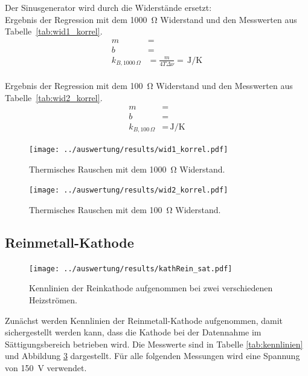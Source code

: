 Der Sinusgenerator wird durch die Widerstände ersetzt:\\
Ergebnis der Regression mit dem \SI{1000}{\ohm} Widerstand und den Messwerten aus \mbox{Tabelle \ref{tab:wid1_korrel}}.
\begin{align*}
m &= \\
b &= \\
k_{B,1000\,\Omega} &= \frac{m}{4T\Delta\nu} =\,\si{\joule\per\kelvin}\\
\end{align*}

Ergebnis der Regression mit dem \SI{100}{\ohm} Widerstand und den Messwerten aus \mbox{Tabelle \ref{tab:wid2_korrel}}.
\begin{align*}
m &= \\
b &= \\
k_{B,100\,\Omega} &= \,\si{\joule\per\kelvin}
\end{align*}

\begin{figure}[htbp]
	\texttt{[image: ../auswertung/results/wid1\_korrel.pdf]}
	\caption{Thermisches Rauschen mit dem \SI{1000}{\ohm} Widerstand.}
	\label{fig:thermRauschen1}
\end{figure}

\begin{figure}[htbp]
	\texttt{[image: ../auswertung/results/wid2\_korrel.pdf]}
	\caption{Thermisches Rauschen mit dem \SI{100}{\ohm} Widerstand.}
	\label{fig:thermRauschen2}
\end{figure}

\subsection{Reinmetall-Kathode}
\begin{figure}[htbp]
	\texttt{[image: ../auswertung/results/kathRein\_sat.pdf]}
	\caption{Kennlinien der Reinkathode aufgenommen bei zwei verschiedenen Heizströmen.}
	\label{fig:kennlinie}
\end{figure}
Zunächst werden Kennlinien der Reinmetall-Kathode aufgenommen, damit sichergestellt werden kann, dass die Kathode bei der Datennahme im Sättigungsbereich betrieben wird. Die Messwerte sind in Tabelle \ref{tab:kennlinien} und Abbildung \ref{fig:kennlinie} dargestellt. Für alle folgenden Messungen wird eine Spannung von \SI{150}{\volt} verwendet.

